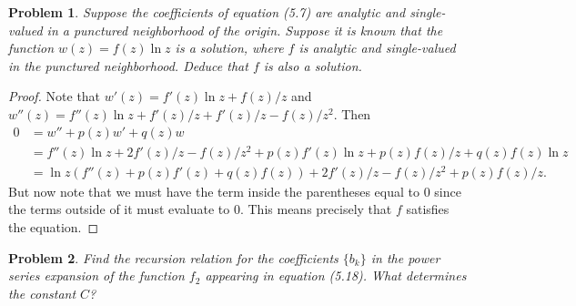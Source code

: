 \documentclass{article}
\newtheorem{problem}{Problem}
\begin{document}
\begin{problem}
Suppose the coefficients of equation (5.7) are analytic and single-valued in a punctured neighborhood of the origin. Suppose it is known that the function $w(z) = f(z)\ln z$ is a solution, where $f$ is analytic and single-valued in the punctured neighborhood. Deduce that $f$ is also a solution.
\end{problem}
\begin{proof}
Note that $w'(z) = f'(z) \ln z + f(z)/z$ and $w''(z) = f''(z) \ln z + f'(z)/z + f'(z)/z - f(z)/z^2$. Then
\begin{align*}
0
&= w'' + p(z)w' + q(z)w\\
&= f''(z) \ln z + 2f'(z)/z - f(z)/z^2 + p(z)f'(z) \ln z + p(z)f(z)/z + q(z)f(z)\ln z\\
&= \ln z (f''(z) + p(z) f'(z) + q(z) f(z)) + 2 f'(z)/z - f(z)/z^2 + p(z)f(z)/z.
\end{align*}
But now note that we must have the term inside the parentheses equal to $0$ since the terms outside of it must evaluate to $0$. This means precisely that $f$ satisfies the equation.
\end{proof}

\begin{problem}
Find the recursion relation for the coefficients $\{b_k\}$ in the power series expansion of the function $f_2$ appearing in equation (5.18). What determines the constant $C$?
\end{problem}
\end{document}
